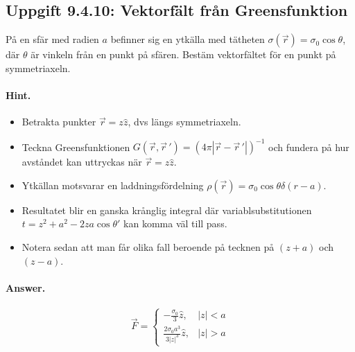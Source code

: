 \documentclass[%
oneside,                 %
final,                   %
10pt]{article}
\newenvironment{doconceexercise}{}{}
\newcounter{doconceexercisecounter}
\begin{document}
\begin{doconceexercise}

\subsection*{Uppgift 9.4.10: Vektorfält från Greensfunktion}

På en sfär med radien $a$ befinner sig en ytkälla med tätheten $\sigma(\vec r)=\sigma_0\cos\theta$, där $\theta$ är vinkeln från en punkt på sfären. Bestäm vektorfältet för en punkt på symmetriaxeln.


\paragraph{Hint.}
\begin{itemize}
\item Betrakta punkter $\vec{r} = z\hat{z}$, dvs längs symmetriaxeln.

\item Teckna Greensfunktionen $G(\vec{r},\vec{r}\,') = (4\pi|\vec{r}-\vec{r}\,'|)^{-1}$ och fundera på hur avståndet kan uttryckas när $\vec{r}=z\hat{z}$.

\item Ytkällan motsvarar en laddningsfördelning $\rho(\vec{r}) = \sigma_0 \cos\theta \delta(r-a)$.

\item Resultatet blir en ganska krånglig integral där variablsubstitutionen $t = z^2 +a^2−2za\cos\theta'$ kan komma väl till pass.

\item Notera sedan att man får olika fall beroende på tecknen på $(z+a)$ och $(z-a)$.
\end{itemize}

\noindent


\paragraph{Answer.}
\begin{equation}
\vec F = \left\{
\begin{array}{ll}
-\frac{\sigma_0}3\hat z, & |z| < a \\
\frac{2\sigma_0a^3}{3|z|^3}\hat z, & |z|>a
\end{array}
\right.
\end{equation}


\end{doconceexercise}
\end{document}

